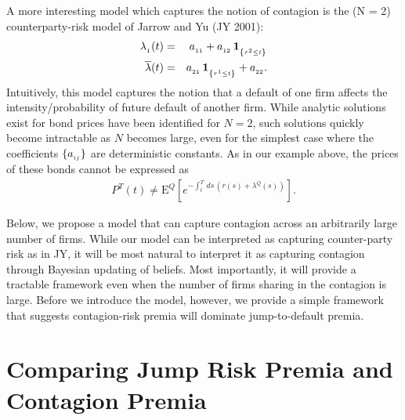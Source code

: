 \documentclass[titlepage,11pt]{article}
\def\by{\begin{eqnarray}}
\def\ey{\end{eqnarray}}
\begin{document}
A more interesting model which captures the notion of contagion is the
(N = 2) counterparty-risk model of Jarrow and Yu (JY 2001):
\begin{eqnarray}\label{JY2a}
\la(t) &=& a\sub{11} + a\sub{12} \, \ind{\tau^{2}\leq t} \\ \label{JY2b}
%
\lb(t) &=& a\sub{21}\, \ind{\tau^{1}\leq t} + a\sub{22} .
\end{eqnarray}
Intuitively, this model captures the notion that a default of one firm affects the intensity/probability
of future default of another firm. While analytic solutions exist for bond prices have been
identified for $N=2$, such solutions quickly become intractable as $N$ becomes large,
even for the simplest case where the coefficients $\{ a_{_{{ij}}}\}$ are deterministic constants.
As in our example above, the prices of these bonds cannot be expressed as
\by
P^{T}(t) \neq \mbox{E}^{Q} \left[ e^{-\int_{t}^{T} \, ds \,(r(s) + \lambda^{Q}(s)) } \right].
\ey

Below, we propose a model that can capture contagion across an arbitrarily large number of firms.
While our model can be interpreted as capturing counter-party risk as in JY,
it will be most natural to interpret it as capturing contagion through Bayesian
updating of beliefs.  Most importantly, it will provide a tractable framework even when the
number of firms sharing in the contagion is large.  Before we introduce the model, however, we
provide a simple framework that suggests contagion-risk premia will dominate jump-to-default premia.




\section{Comparing Jump Risk Premia and Contagion Premia}
\end{document}
